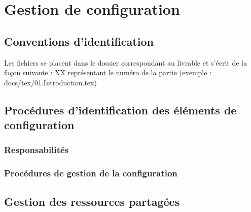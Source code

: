 \section{Gestion de configuration}

\subsection{Conventions d'identification}
Les fichiers se placent dans le dossier correspondant au livrable et s'écrit de la façon suivante : 
XX représentant le numéro de la partie (exemple : docs/tex/01.Introduction.tex)

\subsection{Procédures d'identification des éléments de configuration}


\subsubsection{Responsabilités}


\subsubsection{Procédures de gestion de la configuration}


\subsection{Gestion des ressources partagées}
\pagebreak
